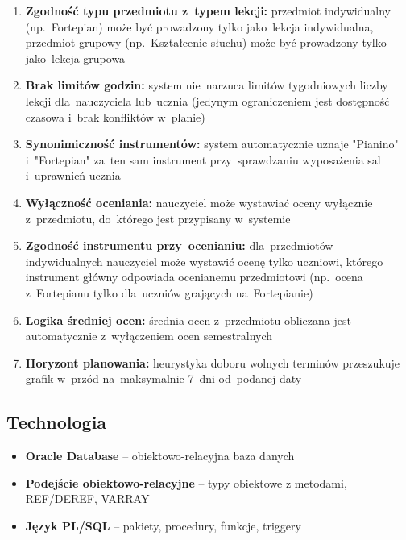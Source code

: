 \documentclass[12pt,a4paper]{article}
\begin{document}
\begin{enumerate}
    \item \textbf{Zgodność typu przedmiotu z~typem lekcji:} przedmiot indywidualny (np.~Fortepian) może być prowadzony tylko jako~lekcja indywidualna, przedmiot grupowy (np.~Kształcenie słuchu) może być prowadzony tylko jako~lekcja grupowa

    \item \textbf{Brak limitów godzin:} system nie~narzuca limitów tygodniowych liczby lekcji dla~nauczyciela lub~ucznia (jedynym ograniczeniem jest dostępność czasowa i~brak konfliktów w~planie)

    \item \textbf{Synonimiczność instrumentów:} system automatycznie uznaje "Pianino" i~"Fortepian" za~ten sam instrument przy~sprawdzaniu wyposażenia sal i~uprawnień ucznia

    \item \textbf{Wyłączność oceniania:} nauczyciel może wystawiać oceny wyłącznie z~przedmiotu, do~którego jest przypisany w~systemie

    \item \textbf{Zgodność instrumentu przy~ocenianiu:} dla~przedmiotów indywidualnych nauczyciel może wystawić ocenę tylko uczniowi, którego instrument główny odpowiada ocenianemu przedmiotowi (np.~ocena z~Fortepianu tylko dla~uczniów grających na~Fortepianie)

    \item \textbf{Logika średniej ocen:} średnia ocen z~przedmiotu obliczana jest automatycznie z~wyłączeniem ocen semestralnych

    \item \textbf{Horyzont planowania:} heurystyka doboru wolnych terminów przeszukuje grafik w~przód na~maksymalnie 7~dni od~podanej daty
\end{enumerate}

\subsection{Technologia}

\begin{itemize}
    \item \textbf{Oracle Database} -- obiektowo-relacyjna baza danych
    \item \textbf{Podejście obiektowo-relacyjne} -- typy obiektowe z metodami, REF/DEREF, VARRAY
    \item \textbf{Język PL/SQL} -- pakiety, procedury, funkcje, triggery
\end{itemize}
\end{document}
